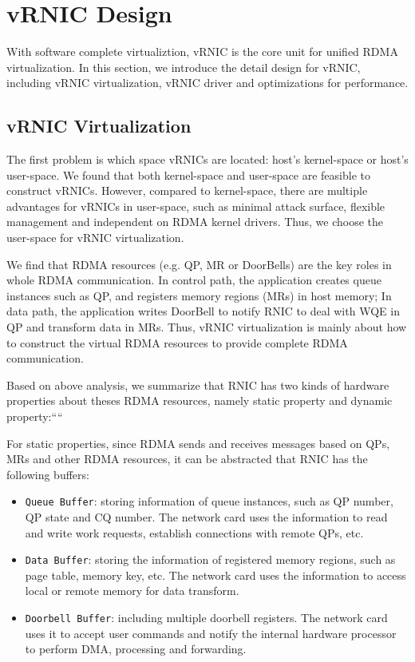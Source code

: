 \section{vRNIC Design}
With software complete virtualiztion, vRNIC is the core unit for unified RDMA virtualization. In this section, we introduce the detail design for vRNIC, including vRNIC virtualization, vRNIC driver and optimizations for performance.

\subsection{vRNIC Virtualization}
The first problem is which space vRNICs are located: host's kernel-space or host's user-space. We found that both kernel-space and user-space are feasible to construct vRNICs. However, compared to kernel-space, there are multiple advantages for vRNICs in user-space, such as minimal attack surface, flexible management and independent on RDMA kernel drivers. Thus, we choose the user-space for vRNIC virtualization.

We find that RDMA resources (e.g. QP, MR or DoorBells) are the key roles in whole RDMA communication. In control path, the application creates queue instances such as QP, and registers memory regions (MRs) in host memory; In data path, the application writes DoorBell to notify RNIC to deal with WQE in QP and transform data in MRs. Thus, vRNIC virtualization is mainly about how to construct the virtual RDMA resources to provide complete RDMA communication. 

Based on above analysis, we summarize that RNIC has two kinds of hardware properties about theses RDMA resources, namely static property and dynamic property:````

For static properties, since RDMA sends and receives messages based on QPs, MRs and other RDMA resources, it can be abstracted that RNIC has the following buffers:

\begin{itemize}
	\item {\verb|Queue Buffer|}: storing information of queue instances, such as QP number, QP state and CQ number. The network card uses the information to read and write work requests, establish connections with remote QPs, etc.  
	\item {\verb|Data Buffer|}: storing the information of registered memory regions, such as page table, memory key, etc. The network card uses the information to access local or remote memory for data transform.  
	\item {\verb|Doorbell Buffer|}: including multiple doorbell registers. The network card uses it to accept user commands and notify the internal hardware processor to perform DMA, processing and forwarding. 
\end{itemize}

